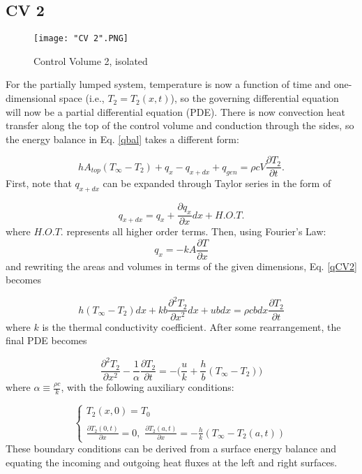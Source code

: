 \documentclass{article}
\newcommand{\dqdx}{\frac{\partial q_x}{\partial x}}
\newcommand{\dTdt}{\frac{\partial T_2}{\partial t}}
\newcommand{\dTdx}{\frac{\partial^2 T_2}{\partial x^2}}
\begin{document}
\subsection*{CV 2}
\begin{figure}[ht!]
    \centering
    \texttt{[image: "CV 2".PNG]}
    \caption{Control Volume 2, isolated}
    \label{fig:CV 2}
\end{figure}

For the partially lumped system, temperature is now a function of time and one-dimensional space (i.e., $T_2 = T_2(x,t)$), so the governing differential equation will now be a partial differential equation (PDE). There is now convection heat transfer along the top of the control volume and conduction through the sides, so the energy balance in Eq. \eqref{qbal} takes a different form:

\begin{equation}
    hA_{top}(T_\infty - T_2) + q_x - q_{x+dx} + q_{gen} = \rho c V \dTdt. 
    \label{qCV2}
\end{equation}
First, note that $q_{x+dx}$ can be expanded through Taylor series in the form of 

\begin{equation}
    q_{x+dx} = q_x + \dqdx dx + H.O.T.
    \label{qxdx}
\end{equation}
where $H.O.T.$ represents all higher order terms. Then, using Fourier's Law:
\begin{equation}
    q_x = -kA\frac{\partial T}{\partial x}
\end{equation}
and rewriting the areas and volumes in terms of the given dimensions, Eq. \eqref{qCV2} becomes

\begin{equation}
    h(T_\infty - T_2)dx + kb\dTdx dx + ubdx = \rho c b dx \dTdt 
\end{equation}
where $k$ is the thermal conductivity coefficient. After some rearrangement, the final PDE becomes

\begin{equation}
    \dTdx - \frac{1}{\alpha} \dTdt = -\bigg(\frac{u}{k} + \frac{h}{b}(T_\infty - T_2)\bigg)
    \label{T2}
\end{equation}
where $\alpha \equiv \frac{\rho c}{k}$, with the following auxiliary conditions:

\begin{equation}
    \begin{cases}
    T_2(x,0) = T_0 \\
    \\
    \frac{\partial T_2(0,t)}{\partial x} = 0, \, \, \frac{\partial T_2(a,t)}{\partial x} = -\frac{h}{k}(T_\infty - T_2(a,t))
    \end{cases}
\end{equation}
These boundary conditions can be derived from a surface energy balance and equating the incoming and outgoing heat fluxes at the left and right surfaces.
\end{document}
